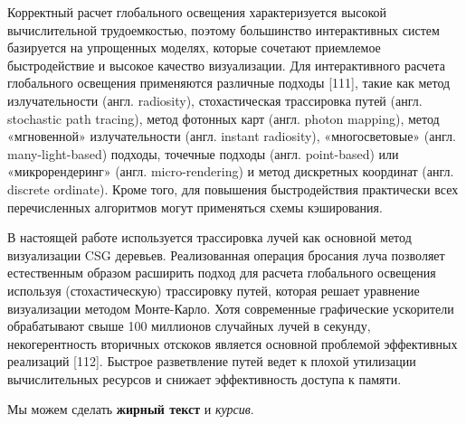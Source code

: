 Корректный расчет глобального освещения характеризуется высокой вычислительной трудоемкостью, поэтому большинство интерактивных систем базируется на упрощенных моделях, которые сочетают приемлемое быстродействие и высокое качество визуализации. Для интерактивного расчета глобального освещения применяются различные подходы [111], такие как метод излучательности (англ. radiosity), стохастическая трассировка путей (англ. stochastic path tracing), метод фотонных карт (англ. photon mapping), метод «мгновенной» излучательности (англ. instant radiosity), «многосветовые» (англ. many-light-based) подходы, точечные подходы (англ. point-based) или «микрорендеринг» (англ. micro-rendering) и метод дискретных координат (англ. discrete ordinate). Кроме того, для повышения быстродействия практически всех перечисленных алгоритмов могут применяться схемы кэширования.

В настоящей работе используется трассировка лучей как основной метод визуализации CSG деревьев. Реализованная операция бросания луча позволяет естественным образом расширить подход для расчета глобального освещения используя (стохастическую) трассировку путей, которая решает уравнение визуализации методом Монте-Карло. Хотя современные графические ускорители обрабатывают свыше 100 миллионов случайных лучей в секунду, некогерентность вторичных отскоков является основной проблемой эффективных реализаций [112]. Быстрое разветвление путей ведет к плохой утилизации вычислительных ресурсов и снижает эффективность доступа к памяти.






Мы можем сделать \textbf{жирный текст} и \textit{курсив}.


